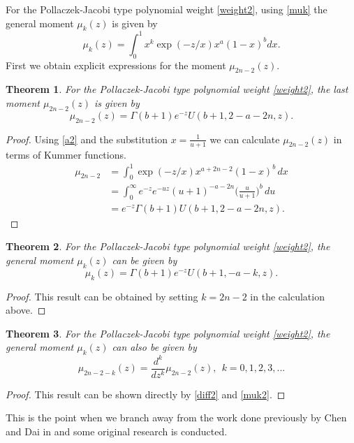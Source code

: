 \documentclass[12pt]{article}
\def\e{e^{-z}}
\newtheorem{mydef}{Theorem}[section]
\numberwithin{figure}{section}
\numberwithin{equation}{section}
\numberwithin{table}{section}
\begin{document}
For the Pollaczek-Jacobi type polynomial weight \eqref{weight2}, using \eqref{muk} the  general moment $\mu_k(z)$ is given by
\begin{equation}\nonumber
\mu_k(z)=\int^1_0x^k\exp(-z/x)x^ a(1-x)^ b dx.
\end{equation}
First we obtain explicit expressions for the moment $\mu_{2n-2}(z)$.
\begin{mydef}
For the Pollaczek-Jacobi type polynomial weight \eqref{weight2}, the  last moment $\mu_{2n-2}(z)$ is given by
\begin{equation}\nonumber
\mu_{2n-2}(z)=\Gamma( b+1)\e U( b+1,2-a-2n,z).
\end{equation}
\end{mydef}
\begin{proof}
Using \eqref{a2} and the substitution $x=\frac{1}{u+1}$ we can calculate $\mu_{2n-2}(z)$ in terms of Kummer functions.
\begin{align}\nonumber
\mu_{2n-2}&=\int^1_{0}\exp(-z/x)x^{a+2n-2}(1-x)^ b\,dx\\\nonumber
&=\int^\infty_{0}\e e^{-uz}(u+1)^{- a-2n}\bigg(\frac{u}{u+1}\bigg)^ b\,du\\\nonumber
&=\e \Gamma( b+1)U( b+1,2- a-2n,z).
\end{align}
\end{proof}
\begin{mydef}
For the Pollaczek-Jacobi type polynomial weight \eqref{weight2}, the  general moment $\mu_k(z)$ can be given by
\begin{equation}\label{muk2}
\mu_k(z)=\Gamma( b+1)\e U( b+1,- a-k,z).
\end{equation}
\end{mydef}
\begin{proof}
This result can be obtained by setting $ k=2n-2$ in the calculation above.
\end{proof}
\begin{mydef}
For the Pollaczek-Jacobi type polynomial weight \eqref{weight2}, the  general moment $\mu_{k}(z)$ can also be given by
\begin{equation}\nonumber
\mu_{2n-2-k}(z)=\frac{d^{k}}{dz^{k}}\mu_{2n-2}(z),~~k=0,1,2,3,...
\end{equation}
\end{mydef}
\begin{proof}
This result can be shown directly by \eqref{diff2} and \eqref{muk2}.
\end{proof}
This is the point when we branch away from the work done previously by Chen and Dai in \cite{Chen} and some original research is conducted.
\end{document}
